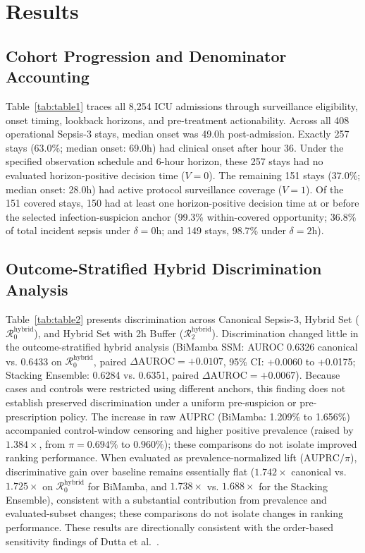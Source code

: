 \documentclass[12pt,a4paper]{article}
\begin{document}
\section{Results}

\subsection{Cohort Progression and Denominator Accounting}
Table~\ref{tab:table1} traces all 8,254 ICU admissions through surveillance eligibility, onset timing, lookback horizons, and pre-treatment actionability. Across all 408 operational Sepsis-3 stays, median onset was 49.0h post-admission. Exactly 257 stays (63.0\%; median onset: 69.0h) had clinical onset after hour 36. Under the specified observation schedule and 6-hour horizon, these 257 stays had no evaluated horizon-positive decision time ($V=0$). The remaining 151 stays (37.0\%; median onset: 28.0h) had active protocol surveillance coverage ($V=1$). Of the 151 covered stays, 150 had at least one horizon-positive decision time at or before the selected infection-suspicion anchor (99.3\% within-covered opportunity; 36.8\% of total incident sepsis under $\delta=0\mathrm{h}$; and 149 stays, 98.7\% under $\delta=2\mathrm{h}$).



\subsection{Outcome-Stratified Hybrid Discrimination Analysis}
Table~\ref{tab:table2} presents discrimination across Canonical Sepsis-3, Hybrid Set ($\mathcal{R}_0^{\mathrm{hybrid}}$), and Hybrid Set with 2h Buffer ($\mathcal{R}_2^{\mathrm{hybrid}}$). Discrimination changed little in the outcome-stratified hybrid analysis (BiMamba SSM: AUROC 0.6326 canonical vs. 0.6433 on $\mathcal{R}_0^{\mathrm{hybrid}}$, paired $\Delta\text{AUROC} = +0.0107$, 95\% CI: +0.0060 to +0.0175; Stacking Ensemble: 0.6284 vs. 0.6351, paired $\Delta\text{AUROC} = +0.0067$). Because cases and controls were restricted using different anchors, this finding does not establish preserved discrimination under a uniform pre-suspicion or pre-prescription policy. The increase in raw AUPRC (BiMamba: 1.209\% to 1.656\%) accompanied control-window censoring and higher positive prevalence (raised by $1.384\times$, from $\pi=0.694\%$ to $0.960\%$); these comparisons do not isolate improved ranking performance. When evaluated as prevalence-normalized lift ($\text{AUPRC}/\pi$), discriminative gain over baseline remains essentially flat ($1.742\times$ canonical vs. $1.725\times$ on $\mathcal{R}_0^{\mathrm{hybrid}}$ for BiMamba, and $1.738\times$ vs. $1.688\times$ for the Stacking Ensemble), consistent with a substantial contribution from prevalence and evaluated-subset changes; these comparisons do not isolate changes in ranking performance. These results are directionally consistent with the order-based sensitivity findings of Dutta et al.~\cite{dutta2026performance}.
\end{document}
